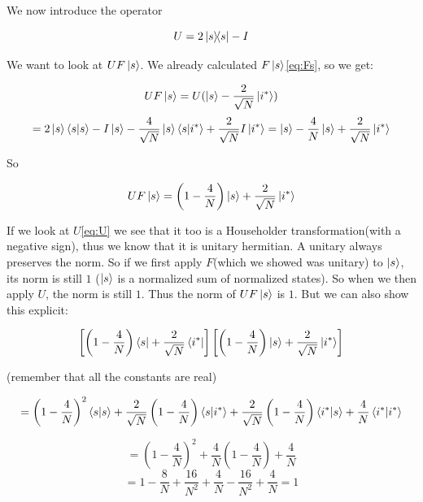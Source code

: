 \documentclass[a4paper,norsk, 10pt]{article}
\begin{document}
We now introduce the operator

\begin{equation}
U = 2\ketbra{s}{s} - I
\end{equation}\label{eq:U}

We want to look at $UF\ket{s}$. We already calculated $F\ket{s}$\eqref{eq:Fs}, so we get: 

\begin{equation}
UF\ket{s} = U(\ket{s} - \frac{2}{\sqrt{N}}\ket{i^*})
\end{equation}
\begin{equation}
= 2\ket{s}\braket{s}{s} - I\ket{s} - \frac{4}{\sqrt{N}}\ket{s}\braket{s}{i^*} + \frac{2}{\sqrt{N}}I\ket{i^*} = \ket{s} - \frac{4}{N}\ket{s} + \frac{2}{\sqrt{N}}\ket{i^*} 
\end{equation}

So

\begin{equation}
UF\ket{s} =  \left(1 - \frac{4}{N}\right)\ket{s} + \frac{2}{\sqrt{N}}\ket{i^*} 
\end{equation}\label{eq:UFs}


If we look at $U$\eqref{eq:U} we see that it too is a Householder transformation(with a negative sign), thus we know that it is unitary hermitian. A unitary always preserves the norm. So if we first apply $F$(which we showed was unitary) to $\ket{s}$, its norm is still $1$ ($\ket{s}$ is a normalized sum of normalized states). So when we then apply $U$, the norm is still $1$. Thus the norm of $UF\ket{s}$ is $1$. But we can also show this explicit:

\begin{equation}
\left[\left(1 - \frac{4}{N}\right)\bra{s} + \frac{2}{\sqrt{N}}\bra{i^*}\right]\left[\left(1 - \frac{4}{N}\right)\ket{s} + \frac{2}{\sqrt{N}}\ket{i^*}\right]
\end{equation}

(remember that all the constants are real)

\begin{equation}
= \left(1 - \frac{4}{N}\right)^2\braket{s}{s} +\frac{2}{\sqrt{N}} \left(1 - \frac{4}{N}\right)\bra{s}\ket{i^*} + \frac{2}{\sqrt{N}} \left(1 - \frac{4}{N}\right)\bra{i^*}\ket{s} + \frac{4}{N}\braket{i^*}{i^*}
\end{equation}

\begin{equation}
= \left(1 - \frac{4}{N}\right)^2 + \frac{4}{N}\left(1 - \frac{4}{N}\right) + \frac{4}{N}
\end{equation}
\begin{equation}
= 1 - \frac{8}{N} + \frac{16}{N^2} + \frac{4}{N} - \frac{16}{N^2} + \frac{4}{N} = 1
\end{equation}
\end{document}

